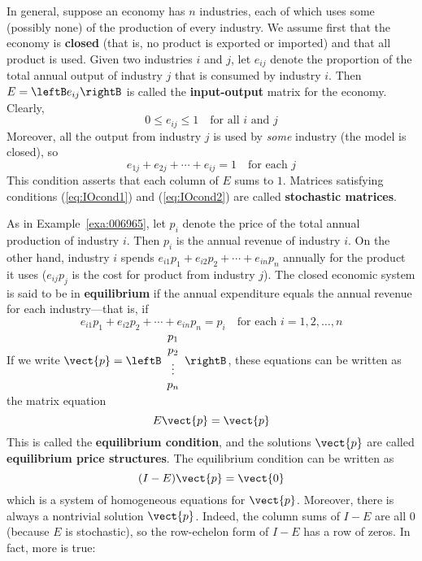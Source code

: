 In general, suppose an economy has $n$ industries, each of which uses some (possibly none) of the production of every industry. We assume first that the economy is \textbf{closed} (that is, no product is exported or imported) and that all product is used. Given two industries $i$ and $j$, let $e_{ij}$ denote the proportion of the total annual output of industry $j$ that is consumed by industry $i$. Then $E = \leftB e_{ij} \rightB$ is called the \textbf{input-output} matrix for the economy. Clearly,
\begin{equation}\label{eq:IOcond1}
0 \leq e_{ij} \leq 1 \quad \mbox{for all } i \mbox{ and } j
\end{equation}
Moreover, all the output from industry $j$ is used by \textit{some} industry (the model is closed), so
\begin{equation}\label{eq:IOcond2}
e_{1j} + e_{2j} + \cdots + e_{ij} = 1 \quad \mbox{for each } j
\end{equation}
This condition asserts that each column of $E$ sums to $1$. Matrices satisfying conditions (\ref{eq:IOcond1}) and (\ref{eq:IOcond2}) are called \textbf{stochastic matrices}.

As in Example~\ref{exa:006965}, let $p_{i}$ denote the price of the total annual production of industry $i$. Then $p_{i}$ is the annual revenue of industry $i$. On the other hand, industry $i$ spends $e_{i1}p_{1} + e_{i2}p_{2} + \cdots + e_{in}p_{n}$ annually for the product it uses ($e_{ij}p_{j}$ is the cost for product from industry $j$). The closed economic system is said to be in \textbf{equilibrium} if the annual expenditure equals the annual revenue for each industry---that is, if
\begin{equation*}
e_{i1}p_{1} + e_{i2}p_{2} + \cdots + e_{in}p_{n} = p_{i} \quad \mbox{for each } i = 1, 2, \dots, n
\end{equation*}
If we write $\vect{p} = \leftB \begin{array}{c}
p_{1} \\
p_{2} \\
\vdots \\
p_{n}
\end{array} \rightB$,
 these equations can be written as the matrix equation
\begin{equation*}
E\vect{p} = \vect{p}
\end{equation*}
This is called the \textbf{equilibrium condition}, and the solutions $\vect{p}$ are called \textbf{equilibrium price structures}. The equilibrium condition can be written as
\begin{equation*}
(I - E)\vect{p} = \vect{0}
\end{equation*}
which is a system of homogeneous equations for $\vect{p}$. Moreover, there is always a nontrivial solution $\vect{p}$. Indeed, the column sums of $I - E$ are all $0$ (because $E$ is stochastic), so the row-echelon form of $I - E$ has a row of zeros. In fact, more is true:

